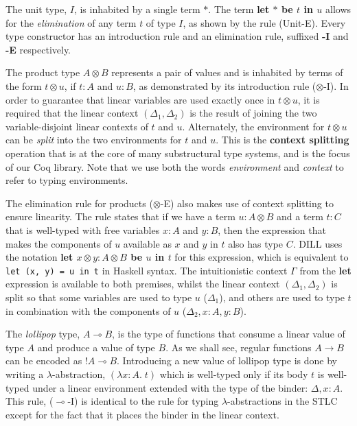 \documentclass[]{unswthesis}
\newcommand{\lolly}{\multimap}
\let\c\texttt
\let\i\textit
\let\b\textbf
\begin{document}
The unit type, $I$, is inhabited by a single term $*$. The term \b{let $*$ be $t$ in $u$} allows for the \i{elimination} of any term $t$ of type $I$, as shown by the rule (Unit-E). Every type constructor has an introduction rule and an elimination rule, suffixed \b{-I} and \b{-E} respectively.

The product type $A \otimes B$ represents a pair of values and is inhabited by terms of the form $t \otimes u$, if $t : A$ and $u : B$, as demonstrated by its introduction rule ($\otimes$-I). In order to guarantee that linear variables are used exactly once in $t \otimes u$, it is required that the linear context $(\Delta_1, \Delta_2)$ is the result of joining the two variable-disjoint linear contexts of $t$ and $u$. Alternately, the environment for $t \otimes u$ can be \i{split} into the two environments for $t$ and $u$. This is the \b{context splitting} operation that is at the core of many substructural type systems, and is the focus of our Coq library. Note that we use both the words \i{environment} and \i{context} to refer to typing environments.

The elimination rule for products ($\otimes$-E) also makes use of context splitting to ensure linearity. The rule states that if we have a term $u : A \otimes B$ and a term $t : C$ that is well-typed with free variables $x : A$ and $y : B$, then the expression that makes the components of $u$ available as $x$ and $y$ in $t$ also has type $C$. DILL uses the notation \b{let $x \otimes y : A \otimes B$ be $u$ in $t$} for this expression, which is equivalent to \c{let (x, y) = u in t} in Haskell syntax. The intuitionistic context $\Gamma$ from the \b{let} expression is available to both premises, whilst the linear context $(\Delta_1, \Delta_2)$ is split so that some variables are used to type $u$ ($\Delta_1$), and others are used to type $t$ in combination with the components of $u$ ($\Delta_2, x : A, y : B$).

The \i{lollipop} type, $A \lolly B$, is the type of functions that consume a linear value of type $A$ and produce a value of type $B$. As we shall see, regular functions $A \to B$ can be encoded as $!A \lolly B$. Introducing a new value of lollipop type is done by writing a $\lambda$-abstraction, $(\lambda x : A. \; t)$ which is well-typed only if its body $t$ is well-typed under a linear environment extended with the type of the binder: $\Delta, x : A$. This rule, ($\lolly$-I) is identical to the rule for typing $\lambda$-abstractions in the STLC except for the fact that it places the binder in the linear context.
\end{document}
